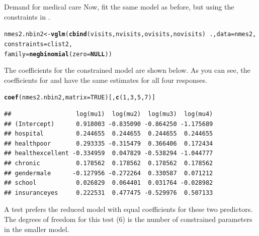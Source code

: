 \documentclass[11pt]{book}\usepackage[]{graphicx}\usepackage[]{color}
\makeatletter
\newcommand{\hlnum}[1]{\textcolor[rgb]{0.686,0.059,0.569}{#1}}%
\newcommand{\hlopt}[1]{\textcolor[rgb]{0,0,0}{#1}}%
\newcommand{\hlstd}[1]{\textcolor[rgb]{0.345,0.345,0.345}{#1}}%
\newcommand{\hlkwa}[1]{\textcolor[rgb]{0.161,0.373,0.58}{\textbf{#1}}}%
\newcommand{\hlkwb}[1]{\textcolor[rgb]{0.69,0.353,0.396}{#1}}%
\newcommand{\hlkwc}[1]{\textcolor[rgb]{0.333,0.667,0.333}{#1}}%
\newcommand{\hlkwd}[1]{\textcolor[rgb]{0.737,0.353,0.396}{\textbf{#1}}}%
\newenvironment{kframe}{%
 \def\at@end@of@kframe{}%
 \ifinner\ifhmode%
  \def\at@end@of@kframe{\end{minipage}}%
  \begin{minipage}{\columnwidth}%
 \fi\fi%
 \def\FrameCommand##1{\hskip\@totalleftmargin \hskip-\fboxsep
 \colorbox{shadecolor}{##1}\hskip-\fboxsep
     \hskip-\linewidth \hskip-\@totalleftmargin \hskip\columnwidth}%
 \MakeFramed {\advance\hsize-\width
   \@totalleftmargin\z@ \linewidth\hsize
   \@setminipage}}%
 {\par\unskip\endMakeFramed%
 \at@end@of@kframe}
\newenvironment{knitrout}{}{} %
\renewenvironment{knitrout}{\small\renewcommand{\baselinestretch}{.85}}{} %
\makeatother
\begin{document}
\begin{Example}[nmes5]{Demand for medical care}
Now, fit the same model as before, but using the constraints in .
\begin{knitrout}
\color{fgcolor}\begin{kframe}
\begin{alltt}
\hlstd{nmes2.nbin2} \hlkwb{<-} \hlkwd{vglm}\hlstd{(}\hlkwd{cbind}\hlstd{(visits, nvisits, ovisits, novisits)} \hlopt{~} \hlstd{.,} \hlkwc{data} \hlstd{= nmes2,}
                    \hlkwc{constraints} \hlstd{= clist2,}
                    \hlkwc{family} \hlstd{=} \hlkwd{negbinomial}\hlstd{(}\hlkwc{zero} \hlstd{=} \hlkwa{NULL}\hlstd{))}
\end{alltt}
\end{kframe}
\end{knitrout}

The coefficients for the constrained model are shown below.  As you can see, the coefficients for
 and  have the same estimates for all four responses.
\begin{knitrout}
\color{fgcolor}\begin{kframe}
\begin{alltt}
\hlkwd{coef}\hlstd{(nmes2.nbin2,} \hlkwc{matrix}\hlstd{=}\hlnum{TRUE}\hlstd{)[,}\hlkwd{c}\hlstd{(}\hlnum{1}\hlstd{,}\hlnum{3}\hlstd{,}\hlnum{5}\hlstd{,}\hlnum{7}\hlstd{)]}
\end{alltt}
\begin{verbatim}
##                  log(mu1)  log(mu2)  log(mu3)  log(mu4)
## (Intercept)      0.918003 -0.835090 -0.864250 -1.175689
## hospital         0.244655  0.244655  0.244655  0.244655
## healthpoor       0.293335 -0.315479  0.366406  0.172434
## healthexcellent -0.334959  0.047829 -0.538294 -1.044777
## chronic          0.178562  0.178562  0.178562  0.178562
## gendermale      -0.127956 -0.272264  0.330587  0.071212
## school           0.026829  0.064401  0.031764 -0.028982
## insuranceyes     0.222531  0.477475 -0.529976  0.507133
\end{verbatim}
\end{kframe}
\end{knitrout}
A \LR test prefers the reduced model with equal coefficients for these two predictors. The degrees of freedom
for this test (6) is the number of constrained parameters in the smaller model.
\begin{knitrout}
\color{fgcolor}\begin{kframe}
\begin{alltt}

\end{alltt}
\end{kframe}
\end{knitrout}
\end{Example}
\end{document}
